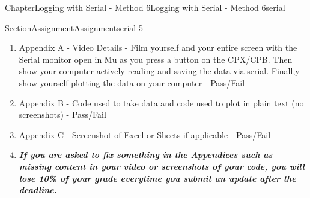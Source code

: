 \documentclass[oneside,10pt,]{book}
\newcommand{\alert}[1]{\textbf{\textit{#1}}}
\numberwithin{equation}{section}
\begin{document}
\begin{chapterptx}{Chapter}{Logging with Serial - Method 6}{}{Logging with Serial - Method 6}{}{}{serial}
\begin{sectionptx}{Section}{Assignment}{}{Assignment}{}{}{serial-5}
\begin{enumerate}
\item{}Appendix A - Video Details - Film yourself and your entire screen with the Serial monitor open in Mu as you press a button on the CPX\slash{}CPB. Then show your computer actively reading and saving the data via serial. Finall,y show yourself plotting the data on your computer - Pass\slash{}Fail%
\item{}Appendix B - Code used to take data and code used to plot in plain text (no screenshots) - Pass\slash{}Fail%
\item{}Appendix C - Screenshot of Excel or Sheets if applicable - Pass\slash{}Fail%
\item{}\alert{If you are asked to fix something in the Appendices such as missing content in your video or screenshots of your code, you will lose 10\% of your grade everytime you submit an update after the deadline.}%
\end{enumerate}
\end{sectionptx}
\end{chapterptx}
%
%
\typeout{************************************************}
\typeout{************************************************}
%
\end{document}
